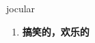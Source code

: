 
\begin{frame}
{\huge jocular}
\begin{center}
\begin{enumerate}\Large
  \item \textbf{搞笑的，欢乐的}
\end{enumerate}
\end{center}
\end{frame}
